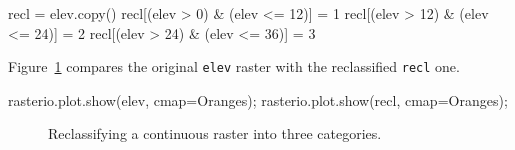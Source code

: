 \documentclass[
  letterpaper,
]{krantz}
\newenvironment{Shaded}{\begin{snugshade}}{\end{snugshade}}
\newcommand{\DecValTok}[1]{\textcolor[rgb]{0.68,0.00,0.00}{#1}}
\newcommand{\NormalTok}[1]{\textcolor[rgb]{0.00,0.23,0.31}{#1}}
\newcommand{\OperatorTok}[1]{\textcolor[rgb]{0.37,0.37,0.37}{#1}}
\newcommand{\StringTok}[1]{\textcolor[rgb]{0.13,0.47,0.30}{#1}}
\begin{document}
\begin{Shaded}
\begin{Highlighting}[]
\NormalTok{recl }\OperatorTok{=}\NormalTok{ elev.copy()}
\NormalTok{recl[(elev }\OperatorTok{\textgreater{}} \DecValTok{0}\NormalTok{)  }\OperatorTok{\&}\NormalTok{ (elev }\OperatorTok{\textless{}=} \DecValTok{12}\NormalTok{)] }\OperatorTok{=} \DecValTok{1}
\NormalTok{recl[(elev }\OperatorTok{\textgreater{}} \DecValTok{12}\NormalTok{) }\OperatorTok{\&}\NormalTok{ (elev }\OperatorTok{\textless{}=} \DecValTok{24}\NormalTok{)] }\OperatorTok{=} \DecValTok{2}
\NormalTok{recl[(elev }\OperatorTok{\textgreater{}} \DecValTok{24}\NormalTok{) }\OperatorTok{\&}\NormalTok{ (elev }\OperatorTok{\textless{}=} \DecValTok{36}\NormalTok{)] }\OperatorTok{=} \DecValTok{3}
\end{Highlighting}
\end{Shaded}

Figure~\ref{fig-raster-reclassify} compares the original \texttt{elev}
raster with the reclassified \texttt{recl} one.

\begin{Shaded}
\begin{Highlighting}[]
\NormalTok{rasterio.plot.show(elev, cmap}\OperatorTok{=}\StringTok{\textquotesingle{}Oranges\textquotesingle{}}\NormalTok{)}\OperatorTok{;}
\NormalTok{rasterio.plot.show(recl, cmap}\OperatorTok{=}\StringTok{\textquotesingle{}Oranges\textquotesingle{}}\NormalTok{)}\OperatorTok{;}
\end{Highlighting}
\end{Shaded}

\begin{figure}

\begin{minipage}{0.50\linewidth}



\end{minipage}%
%
\begin{minipage}{0.50\linewidth}



\end{minipage}%

\caption{\label{fig-raster-reclassify}Reclassifying a continuous raster
into three categories.}

\end{figure}%
\end{document}

